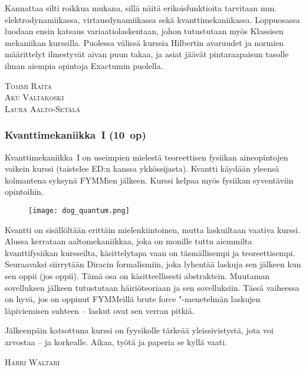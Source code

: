 \documentclass[../ala_hataile.tex]{subfiles}
\begin{document}
	Kannattaa silti roikkua mukana, sillä näitä erikois\-funktioita tarvitaan mm.\,elektro\-dynamiikassa,
	virtaus\-dynamiikassa sekä
	kvantti\-mekaniikassa.
	Loppuosassa luodaan ensin katsaus variaatio\-laskentaan,
	johon tutustutaan myös
	Klassisen mekaniikan kurssilla. Puolessa
	välissä kurssia Hilbertin avaruudet ja normien
	määrittelyt ilmestyvät aivan puun takaa,
	ja asiat jäävät pintaraapaisun tasolle ilman
	aiempia opintoja Exactumin puolella.
	
	\vspace{0.5cm}\noindent
	\textsc{Tommi Raita}\\
	\textsc{Aku Valtakoski}\\
	\textsc{Laura Aalto-Setälä}
	
	\subsubsection*{Kvanttimekaniikka~I (10~op)}
	Kvanttimekaniikka~I on useimpien
	mielestä teoreettisen fysiikan aine\-opintojen
	vaikein kurssi (taistelee ED:n kanssa
	ykkössijasta). Kvantti käydään yleensä
	kolmantena syksynä FYMMien
	jälkeen. Kurssi kelpaa myös fysiikan syventäviin
	opintoihin.
	\begin{figure}[t!]
		\texttt{[image: dog\_quantum.png]}
	\end{figure}
	
	Kvantti on sisällöltään erittäin mielen\-kiintoinen,
	mutta laskuiltaan vaativa kurssi.
	Alussa kerrataan aalto\-mekaniikkaa, joka
	on monille tuttu aiemmilta kvantti\-fysiikan kursseilta, käsittelytapa
	vaan on täsmällisempi ja teoreettisempi.
	Seuraavaksi siirrytään Diracin formalismiin,
	joka lyhentää laskuja sen jälkeen kun
	sen oppii (jos oppii). Tämä osa on käsitteellisesti
	abstraktein. Muutaman sovelluksen
	jälkeen tutustutaan häiriö\-teoriaan ja sen
	sovelluksiin. Tässä vaiheessa on hyvä, jos
	on oppinut FYMMeillä brute
	force "-menetelmän laskujen läpi\-viemisen suhteen -- laskut
	ovat sen verran pitkiä.
	
	Jälkeenpäin katsottuna kurssi on fyysikolle
	tärkeää yleis\-sivistystä, jota voi arvostaa
	-- ja korkealle. Aikaa, työtä ja paperia se
	kyllä vaati.
	
	\vspace{0.5cm}\noindent
	\textsc{Harri Waltari}
	
	
	
	
\end{document}
